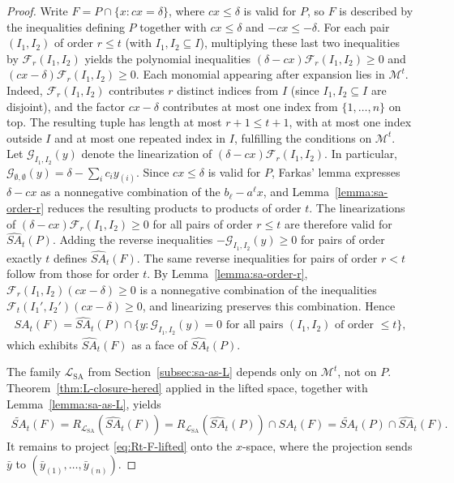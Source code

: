 \documentclass{article}
\newcommand{\F}{\mathcal{F}}
\newcommand{\M}{\mathcal{M}}
\renewcommand{\L}{\mathcal{L}}
\begin{document}
\begin{proof}
    Write $F = P \cap \{x : cx = \delta\}$, where $cx \leq \delta$ is valid for $P$, so $F$ is described by the inequalities defining $P$ together with $cx \leq \delta$ and $-cx \leq -\delta$. For each pair $(I_1, I_2)$ of order $r \leq t$ (with $I_1, I_2 \subseteq I$), multiplying these last two inequalities by $\F_r(I_1, I_2)$ yields the polynomial inequalities $(\delta - cx)\F_r(I_1, I_2) \geq 0$ and $(cx - \delta)\F_r(I_1, I_2) \geq 0$. Each monomial appearing after expansion lies in $\M^t$. Indeed, $\F_r(I_1, I_2)$ contributes $r$ distinct indices from $I$ (since $I_1, I_2 \subseteq I$ are disjoint), and the factor $cx - \delta$ contributes at most one index from $\{1,\ldots,n\}$ on top. The resulting tuple has length at most $r+1 \leq t+1$, with at most one index outside $I$ and at most one repeated index in $I$, fulfilling the conditions on $\M^t$. Let $\mathcal{G}_{I_1, I_2}(y)$ denote the linearization of $(\delta - cx)\F_r(I_1, I_2)$. In particular, $\mathcal{G}_{\emptyset,\emptyset}(y) = \delta - \sum_i c_i y_{(i)}$. Since $cx \leq \delta$ is valid for $P$, Farkas' lemma expresses $\delta - cx$ as a nonnegative combination of the $b_\ell - {a^\ell} x$, and Lemma~\ref{lemma:sa-order-r} reduces the resulting products to products of order $t$. The linearizations of $(\delta - cx)\F_r(I_1, I_2) \geq 0$ for all pairs of order $r \leq t$ are therefore valid for $\widehat{SA}_t(P)$. Adding the reverse inequalities $-\mathcal{G}_{I_1, I_2}(y) \geq 0$ for pairs of order exactly $t$ defines $\widehat{SA}_t(F)$. The same reverse inequalities for pairs of order $r < t$ follow from those for order $t$. By Lemma~\ref{lemma:sa-order-r}, $\F_r(I_1, I_2)(cx-\delta) \geq 0$ is a nonnegative combination of the inequalities $\F_t(I_1', I_2')(cx-\delta) \geq 0$, and linearizing preserves this combination. Hence
    \begin{align}
        \widehat{SA}_t(F) = \widehat{SA}_t(P) \cap \bigl\{y : \mathcal{G}_{I_1, I_2}(y) = 0 \text{ for all pairs } (I_1, I_2) \text{ of order } \leq t\bigr\}, \label{eq:hat-SA-F}
    \end{align}
    which exhibits $\widehat{SA}_t(F)$ as a face of $\widehat{SA}_t(P)$.

    The family $\L_{\mathrm{SA}}$ from Section~\ref{subsec:sa-as-L} depends only on $\M^t$, not on $P$. Theorem~\ref{thm:L-closure-hered} applied in the lifted space, together with Lemma~\ref{lemma:sa-as-L}, yields
    \begin{align}
        \widetilde{SA}_t(F) = R_{\L_{\mathrm{SA}}}(\widehat{SA}_t(F)) = R_{\L_{\mathrm{SA}}}(\widehat{SA}_t(P)) \cap \widehat{SA}_t(F) = \widetilde{SA}_t(P) \cap \widehat{SA}_t(F). \label{eq:Rt-F-lifted}
    \end{align}
    It remains to project \eqref{eq:Rt-F-lifted} onto the $x$-space, where the projection sends $\bar y$ to $(\bar y_{(1)},\ldots,\bar y_{(n)})$.


\end{proof}
\end{document}
